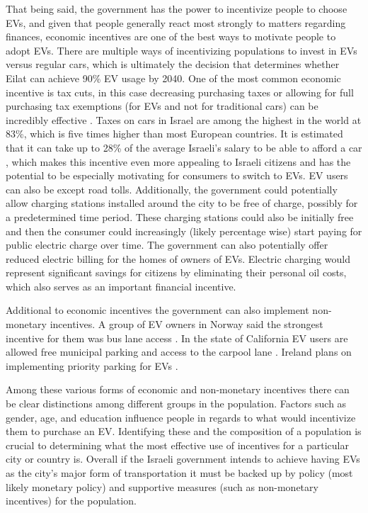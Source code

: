 \documentclass{article}                         %
\begin{document}
That being said, the government has the power to incentivize people to choose EVs, and given that people generally react most strongly to matters regarding finances, economic incentives are one of the best ways to motivate people to adopt EVs. There are multiple ways of incentivizing populations to invest in EVs versus regular cars, which is ultimately the decision that determines whether Eilat can achieve 90\% EV usage by 2040. One of the most common economic incentive is tax cuts, in this case decreasing purchasing taxes or allowing for full purchasing tax exemptions (for EVs and not for traditional cars) can be incredibly effective \cite{Katsovitch2011JIMS:Highest}. Taxes on cars in Israel are among the highest in the world at 83\%, which is five times higher than most European countries. It is estimated that it can take up to 28\% of the average Israeli’s salary to be able to afford a car \cite{Katsovitch2011JIMS:Highest}, which makes this incentive even more appealing to Israeli citizens and has the potential to be especially motivating for consumers to switch to EVs. EV users can also be except road tolls. Additionally, the government could potentially allow charging stations installed around the city to be free of charge, possibly for a predetermined time period. These charging stations could also be initially free and then the consumer could increasingly (likely percentage wise) start paying for public electric charge over time. The government can also potentially offer reduced electric billing for the homes of owners of EVs. Electric charging would represent significant savings for citizens by eliminating their personal oil costs, which also serves as an important financial incentive.

Additional to economic incentives the government can also implement non-monetary incentives. A group of EV owners in Norway said the strongest incentive for them was bus lane access \cite{Bjerkan2016IncentivesNorway}. In the state of California EV users are allowed free municipal parking and access to the carpool lane \cite{TeslaElectricIncentives}. Ireland plans on implementing priority parking for EVs \cite{SustainableEnergyAuthorityofIreland2011ElectricRoadmap}.

Among these various forms of economic and non-monetary incentives there can be clear distinctions among different groups in the population. Factors such as gender, age, and education influence people in regards to what would incentivize them to purchase an EV. Identifying these and the composition of a population is crucial to determining what the most effective use of incentives for a particular city or country is. Overall if the Israeli government intends to achieve having EVs as the city's major form of transportation it must be backed up by policy (most likely monetary policy) and supportive measures (such as non-monetary incentives) for the population.
\end{document}
